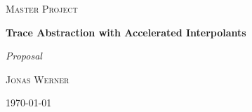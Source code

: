 \documentclass{article}
\begin{document}
	\newcommand{\HorizontalLine}{\rule{\linewidth}{0.3mm}}
	
		\begin{center}
		{\scshape\Large Master Project \par}
		\vspace{1.5cm}
		{\huge\bfseries Trace Abstraction with Accelerated Interpolants \par}
		{\Huge\itshape Proposal \par}
		\vspace{1cm}
		{\large \scshape Jonas Werner\par}
		\vspace{0.5cm}
		{\today \vspace{2cm}} 
		
		\end{center}
\end{document}
